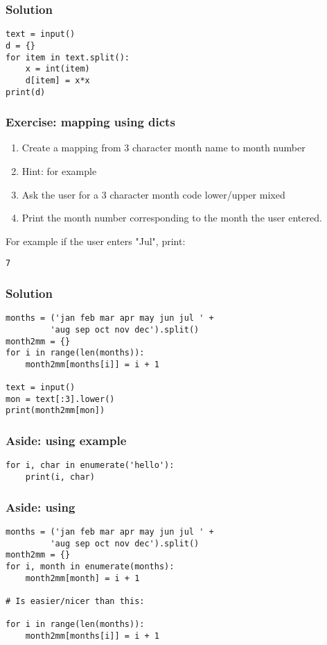 \documentclass[14pt,compress]{beamer}
\begin{document}
\begin{frame}
\frametitle{Solution}
\begin{lstlisting}
text = input()
d = {}
for item in text.split():
    x = int(item)
    d[item] = x*x
print(d)
\end{lstlisting}
\end{frame}


\begin{frame}
  \frametitle{Exercise: mapping using dicts}
  \begin{enumerate}
  \item Create a mapping from 3 character month name to month number
  \item Hint: for example 
  \item Ask the user for a 3 character month code lower/upper mixed
  \item Print the month number corresponding to the month the user entered.
  \end{enumerate}
For example if the user enters "Jul", print:
\begin{lstlisting}
7
\end{lstlisting}
\end{frame}

\begin{frame}
\frametitle{Solution}
\begin{lstlisting}
months = ('jan feb mar apr may jun jul ' +
         'aug sep oct nov dec').split()
month2mm = {}
for i in range(len(months)):
    month2mm[months[i]] = i + 1

text = input()
mon = text[:3].lower()
print(month2mm[mon])
\end{lstlisting}
\end{frame}

\begin{frame}
\frametitle{Aside: using  example}
\begin{lstlisting}
for i, char in enumerate('hello'):
    print(i, char)
\end{lstlisting}
\end{frame}

\begin{frame}
\frametitle{Aside: using }
\begin{lstlisting}
months = ('jan feb mar apr may jun jul ' +
         'aug sep oct nov dec').split()
month2mm = {}
for i, month in enumerate(months):
    month2mm[month] = i + 1

# Is easier/nicer than this:

for i in range(len(months)):
    month2mm[months[i]] = i + 1
\end{lstlisting}

\end{frame}
\end{document}
